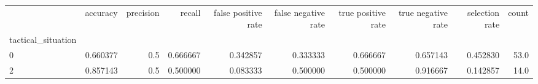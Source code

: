 \begin{tabular}{lrrrrrrrrr}
\toprule
{} &  accuracy &  precision &    recall &  false positive rate &  false negative rate &  true positive rate &  true negative rate &  selection rate &  count \\
tactical\_situation &           &            &           &                      &                      &                     &                     &                 &        \\
\midrule
0                  &  0.660377 &        0.5 &  0.666667 &             0.342857 &             0.333333 &            0.666667 &            0.657143 &        0.452830 &   53.0 \\
2                  &  0.857143 &        0.5 &  0.500000 &             0.083333 &             0.500000 &            0.500000 &            0.916667 &        0.142857 &   14.0 \\
\bottomrule
\end{tabular}
